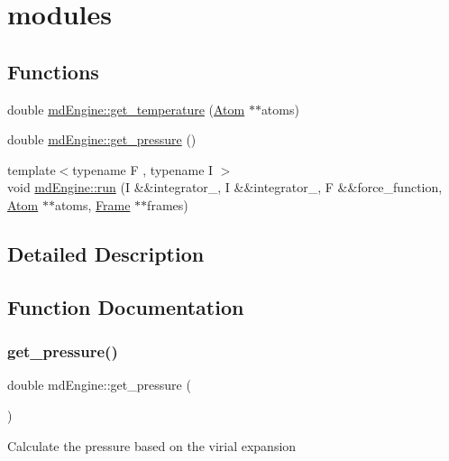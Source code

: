 \hypertarget{group___main}{}\section{modules}
\label{group___main}
\subsection*{Functions}
\begin{DoxyCompactItemize}
\item 
double \mbox{\hyperlink{group___main_ga5f8cc3610166e26157ab48c1905bd2b7}{md\+Engine\+::get\+\_\+temperature}} (\mbox{\hyperlink{class_atom}{Atom}} $\ast$$\ast$atoms)
\item 
double \mbox{\hyperlink{group___main_ga43703c5bde3f0a0ffd916e8c030d5d33}{md\+Engine\+::get\+\_\+pressure}} ()
\item 
{\footnotesize template$<$typename F , typename I $>$ }\\void \mbox{\hyperlink{group___main_ga9814b46948bb9bf9930a3a9392aa3a94}{md\+Engine\+::run}} (I \&\&integrator\+\_, I \&\&integrator\+\_, F \&\&force\+\_\+function, \mbox{\hyperlink{class_atom}{Atom}} $\ast$$\ast$atoms, \mbox{\hyperlink{class_frame}{Frame}} $\ast$$\ast$frames)
\end{DoxyCompactItemize}


\subsection{Detailed Description}


\subsection{Function Documentation}
\mbox{\label{group___main_ga43703c5bde3f0a0ffd916e8c030d5d33}} 
\subsubsection{\texorpdfstring{get\+\_\+pressure()}{get\_pressure()}}
{\footnotesize\ttfamily double md\+Engine\+::get\+\_\+pressure (\begin{DoxyParamCaption}{ }\end{DoxyParamCaption})}

Calculate the pressure based on the virial expansion\mbox{\label{group___main_ga5f8cc3610166e26157ab48c1905bd2b7}} 
